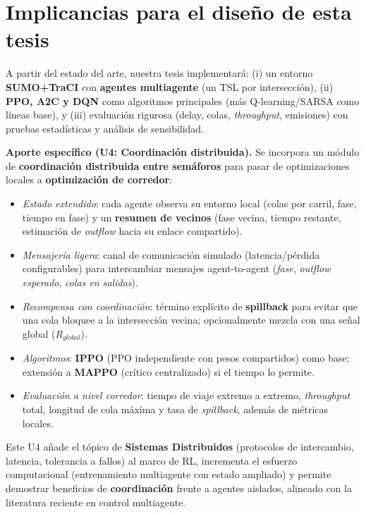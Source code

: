 \section{Implicancias para el diseño de esta tesis}

A partir del estado del arte, nuestra tesis implementará: (i) un entorno \textbf{SUMO+TraCI} con \textbf{agentes multiagente} (un TSL por intersección), (ii) \textbf{PPO, A2C y DQN} como algoritmos principales (más Q-learning/SARSA como líneas base), y (iii) evaluación rigurosa (delay, colas, \textit{throughput}, emisiones) con pruebas estadísticas y análisis de sensibilidad.

\noindent\textbf{Aporte específico (U4: Coordinación distribuida).} Se incorpora un módulo de \textbf{coordinación distribuida entre semáforos} para pasar de optimizaciones locales a \textbf{optimización de corredor}: 
\begin{itemize}
    \item \textit{Estado extendido}: cada agente observa su entorno local (colas por carril, fase, tiempo en fase) y un \textbf{resumen de vecinos} (fase vecina, tiempo restante, estimación de \emph{outflow} hacia su enlace compartido).
    \item \textit{Mensajería ligera}: canal de comunicación simulado (latencia/pérdida configurables) para intercambiar mensajes agent-to-agent (\emph{fase}, \emph{outflow esperado}, \emph{colas en salidas}).
    \item \textit{Recompensa con coordinación}: término explícito de \textbf{spillback} para evitar que una cola bloquee a la intersección vecina; opcionalmente mezcla con una señal global (\(R_{global}\)).
    \item \textit{Algoritmos}: \textbf{IPPO} (PPO independiente con pesos compartidos) como base; extensión a \textbf{MAPPO} (crítico centralizado) si el tiempo lo permite.
    \item \textit{Evaluación a nivel corredor}: tiempo de viaje extremo a extremo, \textit{throughput} total, longitud de cola máxima y tasa de \textit{spillback}, además de métricas locales.
\end{itemize}

Este U4 añade el tópico de \textbf{Sistemas Distribuidos} (protocolos de intercambio, latencia, tolerancia a fallos) al marco de RL, incrementa el esfuerzo computacional (entrenamiento multiagente con estado ampliado) y permite demostrar beneficios de \textbf{coordinación} frente a agentes aislados, alineado con la literatura reciente en control multiagente.

